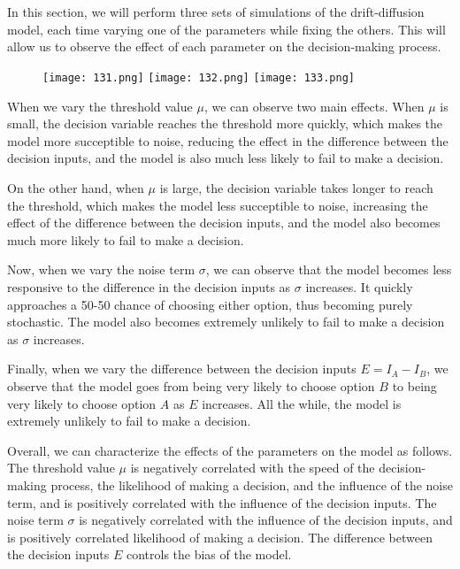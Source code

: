 \documentclass{article}
\begin{document}
\section{}

In this section, we will perform three sets of simulations of the drift-diffusion model, each time varying one of the parameters while fixing the others. This will allow us to observe the effect of each parameter on the decision-making process.

\begin{figure}[ht]
    \centering
    \texttt{[image: 131.png]}
    \texttt{[image: 132.png]}
    \texttt{[image: 133.png]}
\end{figure}


\newpage{}

When we vary the threshold value $\mu$, we can observe two main effects. When $\mu$ is small, the decision variable reaches the threshold more quickly, which makes the model more succeptible to noise, reducing the effect in the difference between the decision inputs, and the model is also much less likely to fail to make a decision. 
\vspace{1em}

On the other hand, when $\mu$ is large, the decision variable takes longer to reach the threshold, which makes the model less succeptible to noise, increasing the effect of the difference between the decision inputs, and the model also becomes much more likely to fail to make a decision.
\vspace{1em}

Now, when we vary the noise term $\sigma$, we can observe that the model becomes less responsive to the difference in the decision inputs as $\sigma$ increases. It quickly approaches a 50-50 chance of choosing either option, thus becoming purely stochastic. The model also becomes extremely unlikely to fail to make a decision as $\sigma$ increases.
\vspace{1em}


Finally, when we vary the difference between the decision inputs $E = I_A - I_B$, we observe that the model goes from being very likely to choose option $B$ to being very likely to choose option $A$ as $E$ increases. All the while, the model is extremely unlikely to fail to make a decision.
\vspace{1em}

Overall, we can characterize the effects of the parameters on the model as follows. The threshold value $\mu$ is negatively correlated with the speed of the decision-making process, the likelihood of making a decision, and the influence of the noise term, and is positively correlated with the influence of the decision inputs. The noise term $\sigma$ is negatively correlated with the influence of the decision inputs, and is positively correlated likelihood of making a decision. The difference between the decision inputs $E$ controls the bias of the model. 
\vspace{1em}
\FloatBarrier
\end{document}
